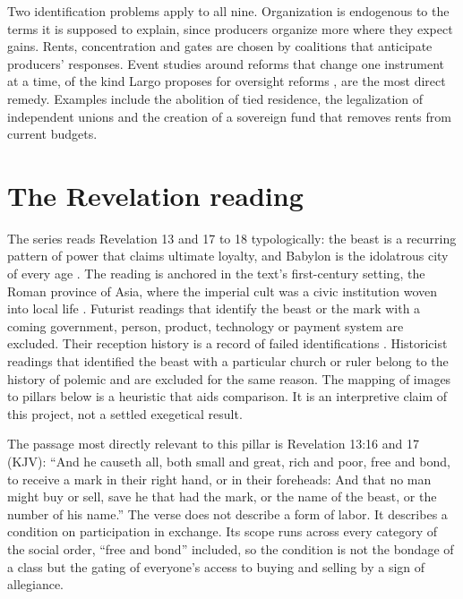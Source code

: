 \documentclass[11pt,letterpaper]{article}
\theoremstyle{definition}
\theoremstyle{remark}
\begin{document}
Two identification problems apply to all nine. Organization is endogenous to the terms it is supposed to explain, since producers organize more where they expect gains. Rents, concentration and gates are chosen by coalitions that anticipate producers' responses. Event studies around reforms that change one instrument at a time, of the kind Largo proposes for oversight reforms \citep{largo2026hbs}, are the most direct remedy. Examples include the abolition of tied residence, the legalization of independent unions and the creation of a sovereign fund that removes rents from current budgets.

\section{The Revelation reading}
\label{sec:revelation}

The series reads Revelation 13 and 17 to 18 typologically: the beast is a recurring pattern of power that claims ultimate loyalty, and Babylon is the idolatrous city of every age \citep{bauckham1993,beale1999}. The reading is anchored in the text's first-century setting, the Roman province of Asia, where the imperial cult was a civic institution woven into local life \citep{price1984,friesen2001}. Futurist readings that identify the beast or the mark with a coming government, person, product, technology or payment system are excluded. Their reception history is a record of failed identifications \citep{boyer1992,fuller1995,mcginn1998}. Historicist readings that identified the beast with a particular church or ruler belong to the history of polemic and are excluded for the same reason. The mapping of images to pillars below is a heuristic that aids comparison. It is an interpretive claim of this project, not a settled exegetical result.

The passage most directly relevant to this pillar is Revelation 13:16 and 17 (KJV): ``And he causeth all, both small and great, rich and poor, free and bond, to receive a mark in their right hand, or in their foreheads: And that no man might buy or sell, save he that had the mark, or the name of the beast, or the number of his name.'' The verse does not describe a form of labor. It describes a condition on participation in exchange. Its scope runs across every category of the social order, ``free and bond'' included, so the condition is not the bondage of a class but the gating of everyone's access to buying and selling by a sign of allegiance.
\end{document}
